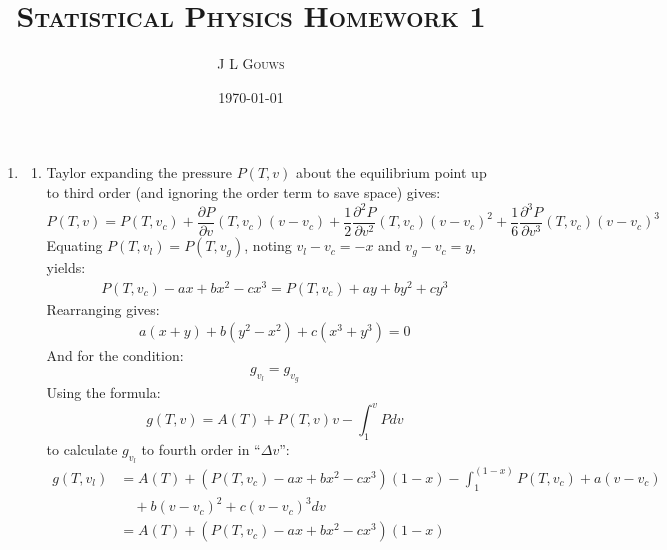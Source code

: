 \documentclass[12pt,a4]{article}
\title{
\textsc{Statistical Physics Homework 1}
}
\author{\textsc{J L Gouws}
}
\date{\today
\\[1cm]}
\begin{document}
\thispagestyle{empty}

\maketitle

\begin{enumerate}
  \item
    \begin{enumerate}
      \item
        Taylor expanding the pressure $P(T, v)$ about the equilibrium point up to third order (and ignoring the order term to save space) gives:
        \begin{equation*}
          P (T, v) = P(T, v_c) + \frac{\partial P}{\partial v}\left(T, v_c\right)(v - v_c)  + \frac{1}{2}\frac{\partial^2 P}{\partial v^2}\left(T, v_c\right)(v - v_c)^2  + \frac{1}{6}\frac{\partial^3 P}{\partial v^3}\left(T, v_c\right)(v - v_c)^3
        \end{equation*}
        Equating $P(T, v_l) = P(T, v_g)$, noting $v_l - v_c = -x$ and $v_g - v_c = y$, yields:
        \begin{align*}
          P(T, v_c) - a x  + b x^2  - c x^3 = P(T, v_c) + a y  + b y^2  + c y^3
        \end{align*}
        Rearranging gives:
        \begin{align}
          a (x + y)  + b ( y^2 - x^2)  + c (x^3 + y ^3) = 0 \label{eq:ChemEquiEquality1}
        \end{align}
        And for the condition:
        \begin{equation*}
          g_{v_l} = g_{v_g}
        \end{equation*}
        Using the formula:
        \begin{equation*}
          g(T, v) = A (T) + P(T, v) v - \int_1 ^v P dv
        \end{equation*}
        to calculate $g_{v_l}$ to fourth order in ``$\Delta v$'':
        \begin{align*}
          g(T, v_l) &= A(T) + \left(P(T, v_c) - a x + b x^2 - c x^3\right)(1 - x) - \int_1^{(1-x)} P(T, v_c) + a (v - v_c) \\
                    & \quad + b(v - v_c)^2  + c (v - v_c)^3 dv\\
                    &= A(T) + \left(P(T, v_c) - a x + b x^2 - c x^3\right)(1 - x) \\

\end{align*}
\end{enumerate}
\end{enumerate}
\end{document}
